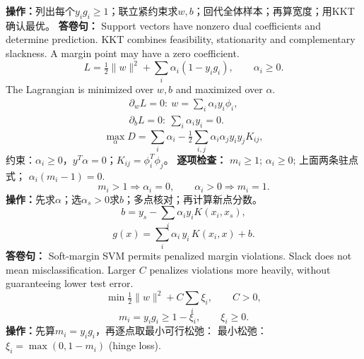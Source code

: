 {\centering{}\par}
\textbf{操作：}列出每个$y_i g_i\ge1$；联立紧约束求$w,b$；回代全体样本；再算宽度；用KKT确认最优。
\textbf{答卷句：} Support vectors have nonzero dual coefficients and determine prediction. KKT combines feasibility, stationarity and complementary slackness. A margin point may have a zero coefficient.
\[L=\tfrac12\|w\|^2+\sum_i\alpha_i(1-y_ig_i),\qquad\alpha_i\ge0.\]
The Lagrangian is minimized over $w,b$ and maximized over $\alpha$.
\[\begin{gathered}
\partial_wL=0:\ w=\sum_i\alpha_i y_i\phi_i,\\
\partial_bL=0:\ \sum_i\alpha_i y_i=0.
\end{gathered}\]
\[\max_\alpha D=\sum_i\alpha_i-\tfrac12\sum_{i,j}
\alpha_i\alpha_jy_iy_jK_{ij},\]
约束：$\alpha_i\ge0$，$y^T\alpha=0$；$K_{ij}=\phi_i^T\phi_j$。
\textbf{逐项检查：} $m_i\ge1$; $\alpha_i\ge0$; 上面两条驻点式； $\alpha_i(m_i-1)=0$.
\[m_i>1\Rightarrow\alpha_i=0,\qquad
\alpha_i>0\Rightarrow m_i=1.\]
\textbf{操作：}先求$\alpha$；选$\alpha_s>0$求$b$；多点核对；再计算新点分数。
\[b=y_s-\sum_i\alpha_i y_iK(x_i,x_s),\]
\[\boxed{g(x)=\sum_i\alpha_i\,\boxed{y_i}\,K(x_i,x)+b}.\]
\columnend\sepcol
\columnstart
{}
\textbf{答卷句：} Soft-margin SVM permits penalized margin violations. Slack does not mean misclassification. Larger $C$ penalizes violations more heavily, without guaranteeing lower test error.
\[\min\tfrac12\|w\|^2+C\sum_i\xi_i,\qquad C>0,\]
\[m_i=y_ig_i\ge1-\xi_i,\qquad\xi_i\ge0.\]
\textbf{操作：}先算$m_i=y_ig_i$，再逐点取最小可行松弛：
最小松弛： $\boxed{\xi_i=\max(0,1-m_i)}$ (hinge loss).
